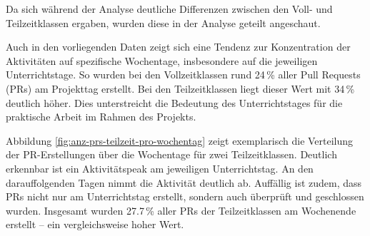 Da sich während der Analyse deutliche Differenzen zwischen den Voll- und Teilzeitklassen ergaben, wurden diese in der Analyse geteilt angeschaut. 

Auch in den vorliegenden Daten zeigt sich eine Tendenz zur Konzentration der Aktivitäten auf spezifische Wochentage, insbesondere auf die jeweiligen Unterrichtstage. So wurden bei den Vollzeitklassen rund 24\,\% aller Pull Requests (PRs) am Projekttag erstellt. Bei den Teilzeitklassen liegt dieser Wert mit 34\,\% deutlich höher. Dies unterstreicht die Bedeutung des Unterrichtstages für die praktische Arbeit im Rahmen des Projekts.

Abbildung \autoref{fig:anz-prs-teilzeit-pro-wochentag} zeigt exemplarisch die Verteilung der PR-Erstellungen über die Wochentage für zwei Teilzeitklassen. Deutlich erkennbar ist ein Aktivitätspeak am jeweiligen Unterrichtstag. An den darauffolgenden Tagen nimmt die Aktivität deutlich ab. Auffällig ist zudem, dass PRs nicht nur am Unterrichtstag erstellt, sondern auch überprüft und geschlossen wurden. Insgesamt wurden 27.7\,\% aller PRs der Teilzeitklassen am Wochenende erstellt – ein vergleichsweise hoher Wert.

